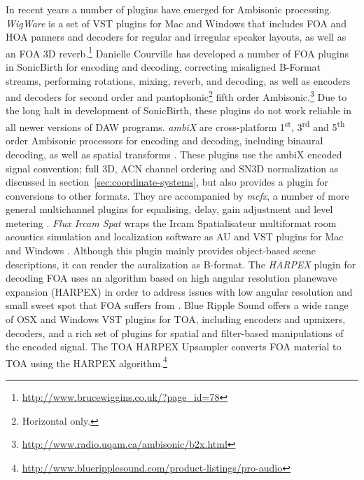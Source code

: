 \documentclass{article}
\begin{document}
In recent years a number of plugins have emerged for Ambisonic processing.
\emph{WigWare} is a set of VST plugins for Mac and Windows that includes FOA and HOA panners and decoders for regular and irregular speaker layouts, as well as an FOA 3D reverb.\footnote{\href{http://www.brucewiggins.co.uk/?page\_id=78}{http://www.brucewiggins.co.uk/?page\_id=78}}
Danielle Courville has developed a number of FOA plugins in SonicBirth for encoding and decoding, correcting misaligned B-Format streams, performing rotations, mixing, reverb, and decoding, as well as encoders and decoders for second order and pantophonic\footnote{Horizontal only.} fifth order Ambisonic.\footnote{\href{http://www.radio.uqam.ca/ambisonic/b2x.html}{http://www.radio.uqam.ca/ambisonic/b2x.html}}
Due to the long halt in development of SonicBirth, these plugins do not work reliable in all newer versions of DAW programs.
\emph{ambiX} are cross-platform 1\textsuperscript{st}, 3\textsuperscript{rd} and 5\textsuperscript{th} order Ambisonic processors for encoding and decoding, including binaural decoding, as well as spatial transforms \cite{Kronlachner2013:ambix,Kronlachner:2014ambi-transforms}.
These plugins use the ambiX encoded signal convention; full 3D, ACN channel ordering and SN3D normalization \cite{Nachbar:2011ambix} as discussed in section~\ref{sec:coordinate-systems}, but also provides a plugin for conversions to other formats.
They are accompanied by \emph{mcfx}, a number of more general multichannel plugins for equalising, delay, gain adjustment and level metering \cite{kronlachner2014:master}.
\emph{Flux Ircam Spat} wraps the Ircam Spatialisateur multiformat room acoustics simulation and localization software as AU and VST plugins for Mac and Windows \cite{flux:2010spat}.
Although this plugin mainly provides object-based scene descriptions, it can render the auralization as B-format.
The \emph{HARPEX} plugin for decoding FOA uses an algorithm based on high angular resolution planewave expansion (HARPEX) in order to address issues with low angular resolution and small sweet spot that FOA suffers from \cite{Berge:2010harpex}.
Blue Ripple Sound offers a wide range of OSX and Windows VST plugins for TOA, including encoders and upmixers, decoders, and a rich set of plugins for spatial and filter-based manipulations of the encoded signal.
The TOA HARPEX Upsampler converts FOA material to TOA using the HARPEX algorithm.\footnote{\href{http://www.blueripplesound.com/product-listings/pro-audio}{http://www.blueripplesound.com/product-listings/pro-audio}}
\end{document}
